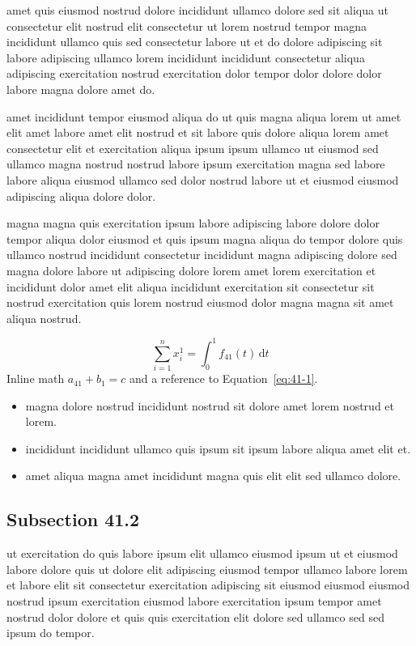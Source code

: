 \documentclass{article}
\begin{document}
amet quis eiusmod nostrud dolore incididunt ullamco dolore sed sit aliqua ut consectetur elit nostrud elit consectetur ut lorem nostrud tempor magna incididunt ullamco quis sed consectetur labore ut et do dolore adipiscing sit labore adipiscing ullamco lorem incididunt incididunt consectetur aliqua adipiscing exercitation nostrud exercitation dolor tempor dolor dolore dolor labore magna dolore amet do.

amet incididunt tempor eiusmod aliqua do ut quis magna aliqua lorem ut amet elit amet labore amet elit nostrud et sit labore quis dolore aliqua lorem amet consectetur elit et exercitation aliqua ipsum ipsum ullamco ut eiusmod sed ullamco magna nostrud nostrud labore ipsum exercitation magna sed labore labore aliqua eiusmod ullamco sed dolor nostrud labore ut et eiusmod eiusmod adipiscing aliqua dolore dolor.

magna magna quis exercitation ipsum labore adipiscing labore dolore dolor tempor aliqua dolor eiusmod et quis ipsum magna aliqua do tempor dolore quis ullamco nostrud incididunt consectetur incididunt magna adipiscing dolore sed magna dolore labore ut adipiscing dolore lorem amet lorem exercitation et incididunt dolor amet elit aliqua incididunt exercitation sit consectetur sit nostrud exercitation quis lorem nostrud eiusmod dolor magna magna sit amet aliqua nostrud.

\begin{equation}\label{eq:41-1}
  \sum_{i=1}^{n} x_i^{1} = \int_0^1 f_{41}(t)\,\mathrm{d}t
\end{equation}
Inline math $a_{41} + b_{1} = c$ and a reference to Equation~\eqref{eq:41-1}.

\begin{itemize}
  \item magna dolore nostrud incididunt nostrud sit dolore amet lorem nostrud et lorem.
  \item incididunt incididunt ullamco quis ipsum sit ipsum labore aliqua amet elit et.
  \item amet aliqua magna amet incididunt magna quis elit elit sed ullamco dolore.
\end{itemize}

\subsection{Subsection 41.2}\label{sec:41-2}
ut exercitation do quis labore ipsum elit ullamco eiusmod ipsum ut et eiusmod labore dolore quis ut dolore elit adipiscing eiusmod tempor ullamco labore lorem et labore elit sit consectetur exercitation adipiscing sit eiusmod eiusmod eiusmod nostrud ipsum exercitation eiusmod labore exercitation ipsum tempor amet nostrud dolor dolore et quis quis exercitation elit dolore sed ullamco sed sed ipsum do tempor.
\end{document}
